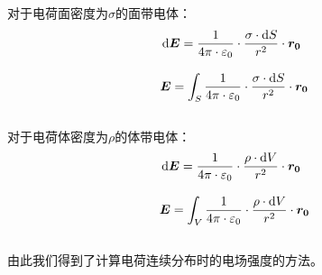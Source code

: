 \documentclass[UTF8]{ctexart}
\newcommand*{\veb}[1]{\vb*{#1}}
\newcommand*{\dif}{\mathop{}\!\mathrm{d}}
\begin{document}
    对于电荷面密度为$\sigma$的面带电体：
    \begin{align}
        &\dif\veb{E}=\frac{1}{4\pi\cdot\varepsilon_0}\cdot\frac{\sigma\cdot\dif S}{r^2}\cdot\veb{r_0}\\[3mm]
        &\veb{E}=\int_S\frac{1}{4\pi\cdot\varepsilon_0}\cdot\frac{\sigma\cdot\dif S}{r^2}\cdot\veb{r_0}
    \end{align}\\
    对于电荷体密度为$\rho$的体带电体：
    \begin{align}
        &\dif\veb{E}=\frac{1}{4\pi\cdot\varepsilon_0}\cdot\frac{\rho\cdot\dif V}{r^2}\cdot\veb{r_0}\\[3mm]
        &\veb{E}=\int_V\frac{1}{4\pi\cdot\varepsilon_0}\cdot\frac{\rho\cdot\dif V}{r^2}\cdot\veb{r_0}
    \end{align}\\
    由此我们得到了计算电荷连续分布时的电场强度的方法。

\newpage
\end{document}
